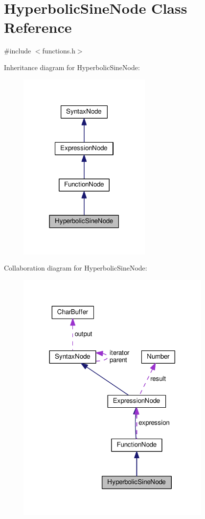 \hypertarget{classHyperbolicSineNode}{}\section{Hyperbolic\+Sine\+Node Class Reference}
\label{classHyperbolicSineNode}


{\ttfamily \#include $<$functions.\+h$>$}



Inheritance diagram for Hyperbolic\+Sine\+Node\+:
\nopagebreak
\begin{figure}[H]
\begin{center}
\leavevmode
\includegraphics[width=186pt]{df/dce/classHyperbolicSineNode__inherit__graph}
\end{center}
\end{figure}


Collaboration diagram for Hyperbolic\+Sine\+Node\+:
\nopagebreak
\begin{figure}[H]
\begin{center}
\leavevmode
\includegraphics[width=272pt]{d8/d86/classHyperbolicSineNode__coll__graph}
\end{center}
\end{figure}
